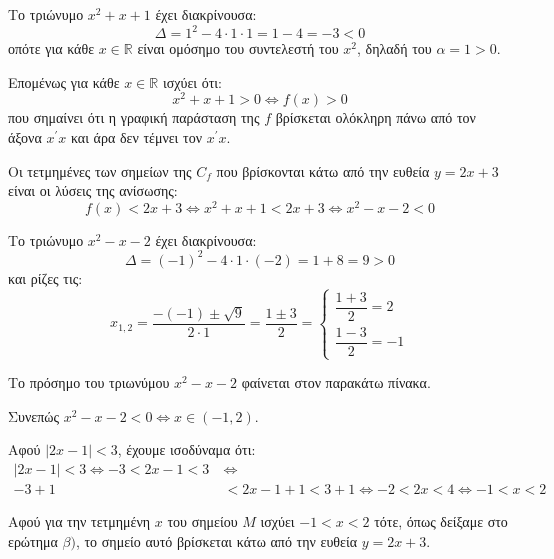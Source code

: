 
\begin{alist}
\item Το τριώνυμο $x^2 + x + 1$ έχει διακρίνουσα:
\[\Delta = 1^2 - 4 \cdot 1 \cdot 1 = 1 - 4 = -3 < 0\]
οπότε για κάθε $x \in \mathbb{R}$ είναι ομόσημο του συντελεστή του $x^2$, δηλαδή του $\alpha = 1 > 0$.

Επομένως για κάθε $x \in \mathbb{R}$ ισχύει ότι:
\[x^2 + x + 1 > 0 \Leftrightarrow f(x) > 0\]
που σημαίνει ότι η γραφική παράσταση της $f$ βρίσκεται ολόκληρη πάνω από τον άξονα $x^\prime x$ και άρα δεν τέμνει τον $x^\prime x$.

\item Οι τετμημένες των σημείων της $C_f$ που βρίσκονται κάτω από την ευθεία $y = 2x + 3$ είναι οι λύσεις της ανίσωσης:
\[f(x) < 2x + 3 \Leftrightarrow x^2 + x + 1 < 2x + 3 \Leftrightarrow x^2 - x - 2 < 0\]

Το τριώνυμο $x^2 - x - 2$ έχει διακρίνουσα:
\[\Delta = (-1)^2 - 4 \cdot 1 \cdot (-2) = 1 + 8 = 9 > 0\]
και ρίζες τις:
\[x_{1,2} = \dfrac{-(-1) \pm \sqrt{9}}{2 \cdot 1} = \dfrac{1 \pm 3}{2} = \begin{cases} \dfrac{1 + 3}{2} = 2 \\ \dfrac{1 - 3}{2} = -1 \end{cases}\]

Το πρόσημο του τριωνύμου $x^2 - x - 2$ φαίνεται στον παρακάτω πίνακα.

\begin{center}
\end{center}

Συνεπώς $x^2 - x - 2 < 0 \Leftrightarrow x \in (-1, 2)$.

\item Αφού $|2x - 1| < 3$, έχουμε ισοδύναμα ότι:
\begin{align*}
|2x - 1| < 3 \Leftrightarrow -3 < 2x - 1 < 3 \ &\Leftrightarrow \\
-3 + 1 &< 2x - 1 + 1 < 3 + 1 \Leftrightarrow -2 < 2x < 4 \Leftrightarrow -1 < x < 2
\end{align*}

Αφού για την τετμημένη $x$ του σημείου $M$ ισχύει $-1 < x < 2$ τότε, όπως δείξαμε στο ερώτημα $\beta)$, το σημείο αυτό βρίσκεται κάτω από την ευθεία $y = 2x + 3$.
\end{alist}

